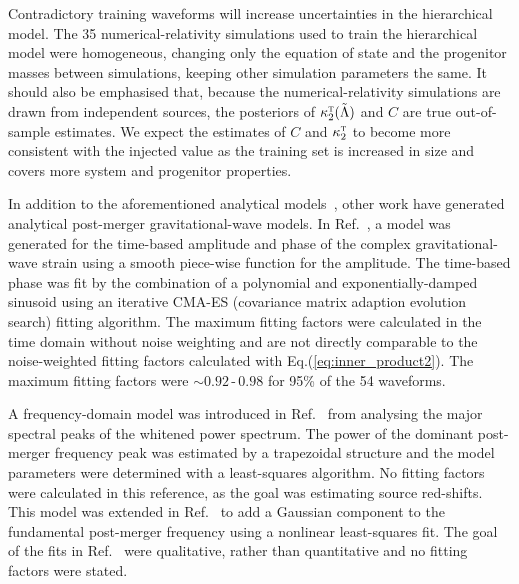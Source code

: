 \documentclass[../Thesis.tex]{subfiles}
\begin{document}
    Contradictory training waveforms will increase uncertainties in the hierarchical model.
    The 35 numerical-relativity simulations used to train the hierarchical model were homogeneous, changing only the equation of state and the progenitor masses between simulations, keeping other simulation parameters the same. 
    It should also be emphasised that, because the numerical-relativity simulations are drawn from independent sources, the posteriors of $\kappa_2^\textsc{t} (\tilde{\Lambda})$ and $C$ are true out-of-sample estimates.
    We expect the estimates of $C$ and $\kappa_2^\textsc{t}$ to become more consistent with the injected value as the training set is increased in size and covers more system and progenitor properties. \par
    
    In addition to the aforementioned analytical models~\cite{Bauswein2016,Bose2018}, other work have generated analytical post-merger gravitational-wave  models. 
    In Ref.~\cite{Hotokezaka2013}, a model  was generated for the time-based amplitude and phase of the complex gravitational-wave strain using a smooth piece-wise function for the amplitude. 
    The time-based phase was fit by the combination of a polynomial and exponentially-damped sinusoid using an iterative CMA-ES (covariance matrix adaption evolution search) fitting algorithm.
    The maximum fitting factors were  calculated in the time domain without noise weighting and are not directly comparable to the noise-weighted fitting factors calculated with Eq.(\ref{eq:inner_product2}).
    The maximum fitting factors were  $\sim\!0.92\,$\nobreakdash-$\,0.98$ for 95\% of the 54 waveforms.\par
    
    A frequency-domain model was introduced in Ref.~\cite{Messenger2014} from analysing the major spectral peaks of the whitened power spectrum.
    The power of the dominant post-merger frequency peak was estimated by a trapezoidal structure and the model parameters were determined with a least-squares algorithm. 
    No fitting factors were calculated in this reference, as the goal was estimating source red-shifts.
    This model was extended in Ref.~\cite{Takami2015} to add a Gaussian component to the fundamental post-merger frequency using a nonlinear least-squares fit. 
    The goal of the fits in Ref.~\cite{Takami2015} were qualitative, rather than quantitative and no fitting factors were stated.\par
    
\end{document}
